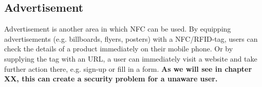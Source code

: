 \subsection{Advertisement}
Advertisement is another area in which NFC can be used. By equipping advertisements (e.g. billboards, flyers, posters) with a NFC/RFID-tag, users can check the details of a product immediately on their mobile phone. Or by supplying the tag with an URL, a user can immediately visit a website and take further action there, e.g. sign-up or fill in a form. \textbf{As we will see in chapter XX, this can create a security problem for a unaware user.} \cite{10.1109/ARES.2009.46}






